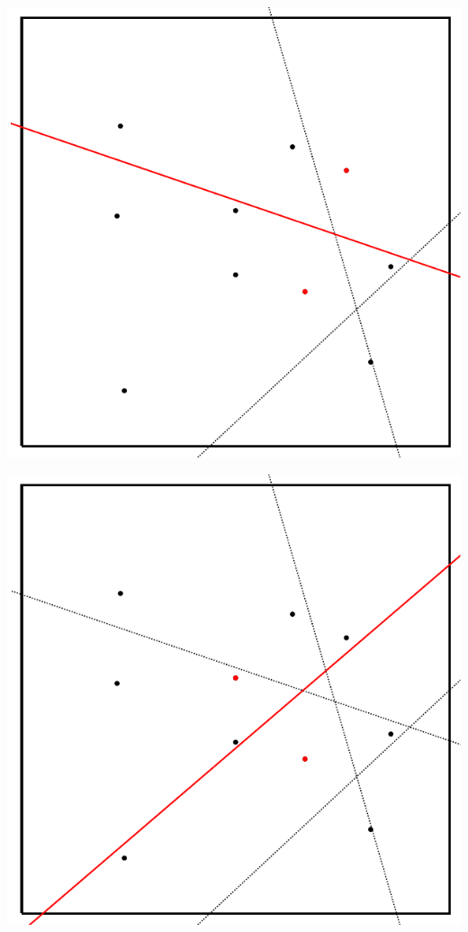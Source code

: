 \begin{frame}[fragile]
\begin{overprint}
\begin{center}
\includegraphics[height=0.9\textheight]{fig/voronoi-b3}
\par\end{center}


\begin{center}
\includegraphics[height=0.9\textheight]{fig/voronoi-b4}
\par\end{center}


\end{overprint}
\end{frame}
